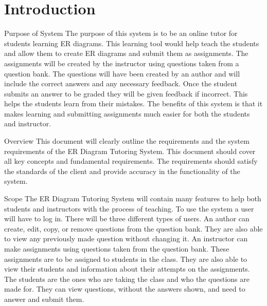 \chapter{Introduction}
	\begin{section}{Purpose of System}
		The purpose of this system is to be an online tutor for students learning ER diagrams. 
		This learning tool would help teach the students and allow them to create ER diagrams and submit 
		them as assignments. The assignments will be created by the instructor using questions taken from 
		a question bank. The questions will have been created by an author and will include the correct answers 
		and any necessary feedback. Once the student submits an answer to be graded they will be given feedback 
		if incorrect. This helps the students learn from their mistakes. The benefits of this system is that it 
		makes learning and submitting assignments much easier for both the students and instructor.
	\end{section}

	\begin{section}{Overview}
		This document will clearly outline the requirements and the system requirements of the ER Diagram 
		Tutoring System. This document should cover all key concepts and fundamental requirements. 
		The requirements should satisfy the standards of the client and provide accuracy in the functionality 
		of the system.
	\end{section}

	\begin{section}{Scope}
		The ER Diagram Tutoring System will contain many features to help both students and instructors with 
		the process of teaching. To use the system a user will have to log in. There will be three different 
		types of users. An author can create, edit, copy, or remove questions from the question bank. 
		They are also able to view any previously made question without changing it. An instructor can 
		make assignments using questions taken from the question bank. These assignments are to be assigned 
		to students in the class. They are also able to view their students and information about their 
		attempts on the assignments. The students are the ones who are taking the class and who the questions 
		are made for. They can view questions, without the answers shown, and need to answer and submit them. 
	\end{section}

